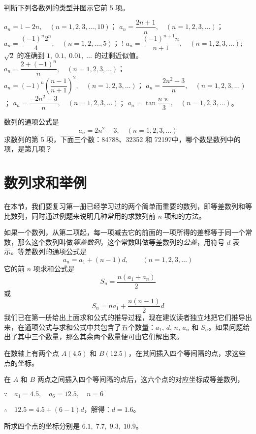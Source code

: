 \begin{Exercise}
\begin{question}
\item 判断下列各数列的类型并图示它前 5 项。
\begin{tasks}
  \task $a_n=1-2n,\quad (n=1,2,3,\ldots,10)$；
  \task $a_n=\dfrac{2n+1}{n},\quad (n=1,2,3,\ldots)$；
  \task $a_n=\dfrac{(-1)^n2^n}{4},\quad (n=1,2,\ldots,5)$；
  \task! $a_n=\dfrac{(-1)^{n+1}n}{n+1},\quad (n=1,2,3,\ldots)$;
  \task* $\sqrt{2}$ 的准确到 $1,\; 0.1,\; 0.01,\; \ldots$ 的过剩近似值。
  \task* $a_n=\dfrac{2+(-1)^n}{n},\quad (n=1,2,3,\ldots)$；
  \task* $a_n=(-1)^n\left(\dfrac{n-1}{n+1}\right)^2,\quad (n=1,2,3,\ldots)$；
  \task $a_n=\dfrac{2n^2-3}{n},\quad (n=1,2,3,\ldots)$；
  \task $a_n=\dfrac{-2n^2-3}{n},\quad (n=1,2,3,\ldots)$；
  \task $a_n=\tan \dfrac{n\uppi}{3},\quad  (n=1,2,3,\ldots)$。
\end{tasks}
\item 数列的通项公式是
\[a_n=2n^2-3,\quad (n=1,2,3,\ldots)\]
求数列的第 5 项，下面三个数：84788、32352 和 72197中，哪个数是数列中的项，是第几项？
\end{question}
\end{Exercise}

\section{数列求和举例}
在本节，我们要复习第一册已经学习过的两个简单而重要的数列，即等差数列和等比数列，同时通过例题来说明几种常用的求数列前 $n$ 项和的方法。

如果一个数列，从第二项起，每一项减去它的前面的一项所得的差都等于同一个常数，那么这个数列叫做\emph{等差数列}，这个常数叫做等差数列的\emph{公差}，用符号 $d$ 表示。等差数列的通项公式是
\[a_n=a_1+(n-1)d,\qquad (n=1,2,3,\ldots)\]
它的前 $n$ 项求和公式是
\[S_n=\frac{n(a_1+a_n)}{2}\]
或
\[S_n=na_1+\frac{n(n-1)}{2}d\]
我们已在第一册给出上面求和公式的推导过程，现在建议读者独立地把它们推导出来，在通项公式与求和公式中共包含了五个数量：$a_1$, $d$, $n$, $a_n$ 和 $S_n$。如果问题给出了其中三个数量，那么其余两个数量便可由它们解出来。

\begin{example}
  在数轴上有两个点 $A(4.5)$ 和 $B(12.5)$，在其间插入四个等间隔的点，求这些点的坐标。
\end{example}

\begin{solution}
  在 $A$ 和 $B$ 两点之间插入四个等间隔的点后，这六个点的对应坐标成等差数列，

$\because\quad     a_1=4.5,\quad a_6=12.5,\quad n=6$

$\therefore\quad     12.5=4.5+(6-1)d$，解得：$d=1.6$。

所求四个点的坐标分别是 $6.1,\; 7.7,\; 9.3,\; 10.9$。
\end{solution}

